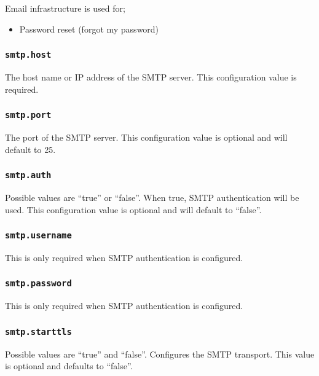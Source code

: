 Email infrastructure is used for;

\begin{itemize}
\item Password reset (forgot my password)
\end{itemize}

\subsubsection{\tt smtp.host}

The host name or IP address of the SMTP server.  This configuration value is required.

\subsubsection{\tt smtp.port}

The port of the SMTP server.  This configuration value is optional and will default to 25.

\subsubsection{\tt smtp.auth}

Possible values are ``true'' or ``false''.  When true, SMTP authentication will be used.  This configuration value is optional and will default to ``false''.

\subsubsection{\tt smtp.username}

This is only required when SMTP authentication is configured.

\subsubsection{\tt smtp.password}

This is only required when SMTP authentication is configured.

\subsubsection{\tt smtp.starttls}

Possible values are ``true'' and ``false''.  Configures the SMTP transport.  This value is optional and defaults to ``false''.